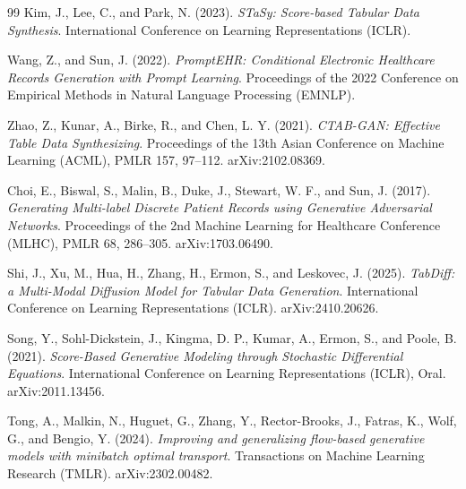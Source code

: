 \documentclass[11pt]{informatics-report}
\begin{document}
\begin{thebibliography}{99}
Kim, J., Lee, C., and Park, N. (2023).
\textit{STaSy: Score-based Tabular Data Synthesis}.
International Conference on Learning Representations (ICLR).

Wang, Z., and Sun, J. (2022).
\textit{PromptEHR: Conditional Electronic Healthcare Records Generation with Prompt Learning}.
Proceedings of the 2022 Conference on Empirical Methods in Natural Language Processing (EMNLP).

Zhao, Z., Kunar, A., Birke, R., and Chen, L. Y. (2021).
\textit{CTAB-GAN: Effective Table Data Synthesizing}.
Proceedings of the 13th Asian Conference on Machine Learning (ACML), PMLR 157, 97--112.
arXiv:2102.08369.

Choi, E., Biswal, S., Malin, B., Duke, J., Stewart, W. F., and Sun, J. (2017).
\textit{Generating Multi-label Discrete Patient Records using Generative Adversarial Networks}.
Proceedings of the 2nd Machine Learning for Healthcare Conference (MLHC), PMLR 68, 286--305.
arXiv:1703.06490.

Shi, J., Xu, M., Hua, H., Zhang, H., Ermon, S., and Leskovec, J. (2025).
\textit{TabDiff: a Multi-Modal Diffusion Model for Tabular Data Generation}.
International Conference on Learning Representations (ICLR).
arXiv:2410.20626.

Song, Y., Sohl-Dickstein, J., Kingma, D. P., Kumar, A., Ermon, S., and Poole, B. (2021).
\textit{Score-Based Generative Modeling through Stochastic Differential Equations}.
International Conference on Learning Representations (ICLR), Oral.
arXiv:2011.13456.

Tong, A., Malkin, N., Huguet, G., Zhang, Y., Rector-Brooks, J., Fatras, K., Wolf, G., and Bengio, Y. (2024).
\textit{Improving and generalizing flow-based generative models with minibatch optimal transport}.
Transactions on Machine Learning Research (TMLR).
arXiv:2302.00482.

\end{thebibliography}


\end{document}
